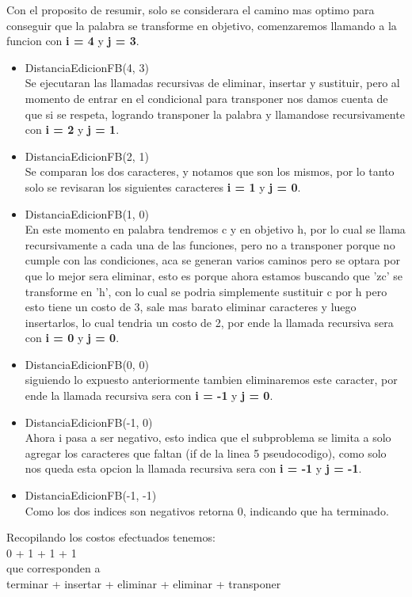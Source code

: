 Con el proposito de resumir, solo se considerara el camino mas optimo para conseguir que la palabra se transforme en objetivo, comenzaremos llamando a la funcion con \textbf{i = 4} y \textbf{j = 3}.
\begin{itemize}
    \item DistanciaEdicionFB(4, 3)\\Se ejecutaran las llamadas recursivas de eliminar, insertar y sustituir, pero al momento de entrar en el condicional para transponer nos damos cuenta de que si se respeta, logrando transponer la palabra y llamandose recursivamente con \textbf{i = 2} y \textbf{j = 1}.
    \item DistanciaEdicionFB(2, 1)\\Se comparan los dos caracteres, y notamos que son los mismos, por lo tanto solo se revisaran los siguientes caracteres \textbf{i = 1} y \textbf{j = 0}.
    \item DistanciaEdicionFB(1, 0)\\En este momento en palabra tendremos c y en objetivo h, por lo cual se llama recursivamente a cada una de las funciones, pero no a transponer porque no cumple con las condiciones, aca se generan varios caminos pero se optara por que lo mejor sera eliminar, esto es porque ahora estamos buscando que 'zc' se transforme en 'h', con lo cual se podria simplemente sustituir c por h pero esto tiene un costo de 3, sale mas barato eliminar caracteres y luego insertarlos, lo cual tendria un costo de 2, por ende la llamada recursiva sera con \textbf{i = 0} y \textbf{j = 0}.
    \item DistanciaEdicionFB(0, 0)\\siguiendo lo expuesto anteriormente tambien eliminaremos este caracter, por ende la llamada recursiva sera con \textbf{i = -1} y \textbf{j = 0}.
    \item DistanciaEdicionFB(-1, 0)\\Ahora i pasa a ser negativo, esto indica que el subproblema se limita a solo agregar los caracteres que faltan (if de la linea 5 pseudocodigo), como solo nos queda esta opcion  la llamada recursiva sera con \textbf{i = -1} y \textbf{j = -1}.
    \item DistanciaEdicionFB(-1, -1)\\Como los dos indices son negativos retorna 0, indicando que ha terminado.
\end{itemize}
Recopilando los costos efectuados tenemos:\\
0 + 1 + 1 + 1\\
que corresponden a\\
terminar + insertar + eliminar + eliminar + transponer\\